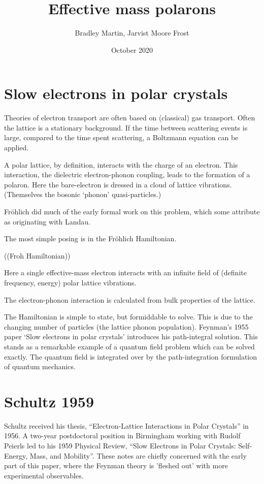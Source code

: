 \documentclass[twocolumn,11pt]{article}
\title{Effective mass polarons}
\author{Bradley Martin, Jarvist Moore Frost}
\date{October 2020}
\begin{document}
\maketitle

\section{Slow electrons in polar crystals}

Theories of electron transport are often based on (classical) gas transport. 
Often the lattice is a stationary background. 
If the time between scattering events is large, compared to the time spent
scattering, a Boltzmann equation can be applied.

A polar lattice, by definition, interacts with the charge of an electron. 
This interaction, the dielectric electron-phonon coupling, leads to the
formation of a polaron. 
Here the bare-electron is dressed in a cloud of lattice vibrations. 
(Themselves the bosonic `phonon' quasi-particles.) 

Fr\"ohlich did much of the early formal work on this problem, which some
attribute as originating with Landau. 

The most simple posing is in the Fr\"ohlich Hamiltonian.

((Froh Hamiltonian))

Here a single effective-mass electron interacts with an infinite field of
(definite frequency, energy) polar lattice vibrations. 

The electron-phonon interaction is calculated from bulk properties of the
lattice.

The Hamiltonian is simple to state, but formiddable to solve. 
This is due to the changing number of particles (the lattice phonon
population). 
Feynman's 1955 paper `Slow electrons in polar crystals'\cite{Feynman1955}
introduces his path-integral solution. 
This stands as a remarkable example of a quantum field problem which can be
solved exactly. 
The quantum field is integrated over by the path-integration formulation of
quantum mechanics. 

\section{Schultz 1959}

Schultz\cite{Fowler2005} received his thesis, ``Electron-Lattice Interactions in
Polar Crystals'' in 1956. 
A two-year postdoctoral position in Birmingham working with Rudolf Peierls led
to his 1959 Physical Review, 
``Slow Electrons in Polar Crystals: Self-Energy, Mass, and
Mobility''\cite{Schultz1959}.  
These notes are chiefly concerned with the early part of this paper, where the
Feynman theory is 'fleshed out' with more experimental observables. 
\end{document}
